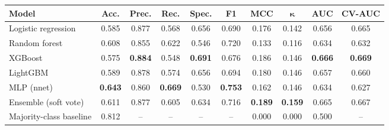 \begin{tabular}{lccccccccc}
\toprule
\textbf{Model} & \textbf{Acc.} & \textbf{Prec.} & \textbf{Rec.} & \textbf{Spec.} & \textbf{F1} & \textbf{MCC} & $\boldsymbol{\kappa}$ & \textbf{AUC} & \textbf{CV-AUC} \\
\midrule
Logistic regression & 0.585 & 0.877 & 0.568 & 0.656 & 0.690 & 0.176 & 0.142 & 0.656 & 0.665 \\
Random forest & 0.608 & 0.855 & 0.622 & 0.546 & 0.720 & 0.133 & 0.116 & 0.634 & 0.632 \\
XGBoost & 0.575 & \textbf{0.884} & 0.548 & \textbf{0.691} & 0.676 & 0.186 & 0.146 & \textbf{0.666} & \textbf{0.669} \\
LightGBM & 0.589 & 0.878 & 0.574 & 0.656 & 0.694 & 0.180 & 0.146 & 0.657 & 0.660 \\
MLP (nnet) & \textbf{0.643} & 0.860 & \textbf{0.669} & 0.530 & \textbf{0.753} & 0.162 & 0.146 & 0.634 & 0.627 \\
Ensemble (soft vote) & 0.611 & 0.877 & 0.605 & 0.634 & 0.716 & \textbf{0.189} & \textbf{0.159} & 0.665 & 0.667 \\
\midrule
Majority-class baseline & 0.812 & -- & -- & -- & -- & 0.000 & 0.000 & 0.500 & -- \\
\bottomrule
\end{tabular}
